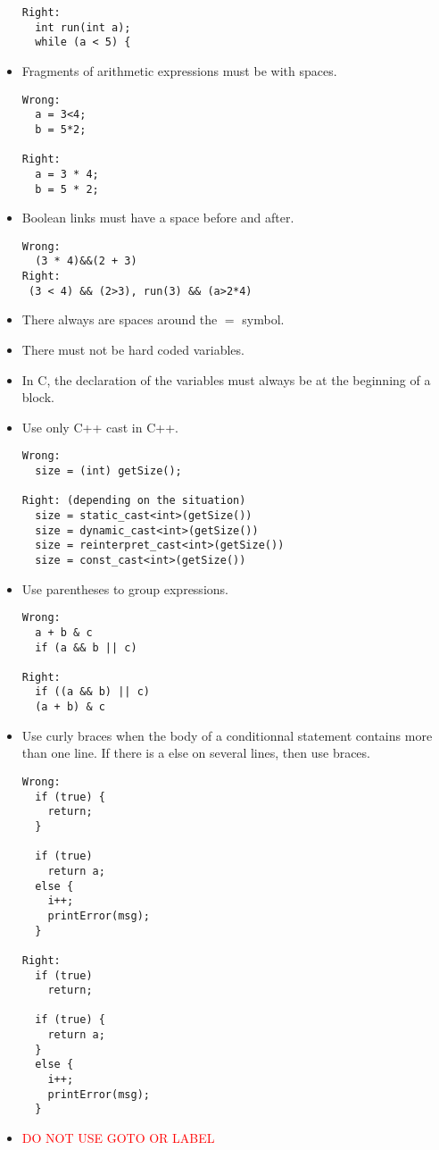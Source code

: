 \documentclass{article}
\begin{document}
\begin{itemize}
\begin{verbatim}
Right: 
  int run(int a);
  while (a < 5) {
\end{verbatim}
\item Fragments of arithmetic expressions must be with
 spaces.
\begin{verbatim}
Wrong: 
  a = 3<4;
  b = 5*2;

Right:
  a = 3 * 4;
  b = 5 * 2;
\end{verbatim}
\item Boolean links must have a space before and after.
\begin{verbatim}
Wrong:
  (3 * 4)&&(2 + 3)
Right:
 (3 < 4) && (2>3), run(3) && (a>2*4)
\end{verbatim}
\item There always are spaces around the $=$ symbol.
\item There must not be hard coded variables.
\item In C, the declaration of the variables must always be
at the beginning of a block.
\item Use only C++ cast in C++.
\begin{verbatim}
Wrong:
  size = (int) getSize();

Right: (depending on the situation)
  size = static_cast<int>(getSize())
  size = dynamic_cast<int>(getSize())
  size = reinterpret_cast<int>(getSize())
  size = const_cast<int>(getSize())
\end{verbatim}
\item Use parentheses to group expressions.
\begin{verbatim}
Wrong:
  a + b & c
  if (a && b || c)

Right:
  if ((a && b) || c)
  (a + b) & c
\end{verbatim}
\item Use curly braces when the body of a conditionnal statement contains more than one line.
If there is a else on several lines, then use braces.
\begin{verbatim}
Wrong:
  if (true) {
    return;
  }

  if (true) 
    return a;
  else {
    i++;
    printError(msg);
  }

Right:
  if (true)
    return;

  if (true) {
    return a;
  }
  else {
    i++;
    printError(msg);
  }
\end{verbatim} 
\item \textcolor{red}{DO NOT USE GOTO OR LABEL}
\end{itemize}
\end{document}
